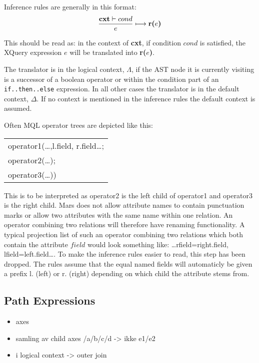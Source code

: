 Inference rules are generally in this format:
\begin{equation*}
\frac{\mbox{\textbf{cxt}}\vdash cond}{e}\longmapsto \mbox{\textbf{r(}}e\mbox{\textbf{)}}
\end{equation*}

This should be read as: in the context of \textbf{cxt}, if condition $cond$ is satisfied, the XQuery expression
$e$ will be translated into \textbf{r(}$e$\textbf{)}.

The translator is in the logical context, $\Lambda$, if the AST node it is currently visiting is a successor of a
boolean operator or within the condition part of an \texttt{if..then..else} expression. In all other cases the
translator is in the default context, $\Delta$. If no context is mentioned in the inference rules the default
context is assumed.

Often MQL operator trees are depicted like this:
\begin{center}
\begin{tabular}{l}
\textsf{operator1(\ldots,l.field, r.field\ldots; } \\ \quad
\textsf{operator2(\ldots);} \\ \quad
\textsf{operator3(\ldots))}
\end{tabular}
\end{center}

This is to be interpreted as \textsf{operator2} is the left child of \textsf{operator1} and \textsf{operator3} is
the right child. Mars does not allow attribute names to contain punctuation marks or allow two attributes with the
same name within one relation. An operator combining two relations will therefore have renaming functionality. A
typical projection list of such an operator combining two relations which both contain the attribute $field$ would
look something like: \textsf{\ldots rfield=right.field, lfield=left.field\ldots}. To make the inference rules
easier to read, this step has been dropped. The rules assume that the equal named fields will automaticly be given
a prefix \textsf{l.} (left) or \textsf{r.} (right) depending on which child the attribute stems from.







\subsection{Path Expressions}
\label{sect:trans:TD:pathExprs}
\begin{itemize}
  \item axes
  \item samling av child axes /a/b/c/d -> ikke e1/e2
  \item i logical context -> outer join
\end{itemize}

